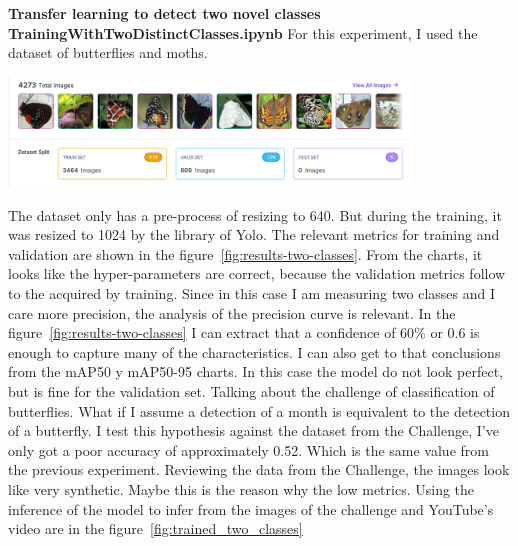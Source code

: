 \documentclass{cpsc202}
\begin{document}
    \newpage
    \textbf{Transfer learning to detect two novel classes}
    \Large\textbf{TrainingWithTwoDistinctClasses.ipynb}
    For this experiment, I used the dataset of butterflies and moths.
    \begin{center}
        \includegraphics[width=0.8\textwidth]{trained_two_classes/dataset_two_classes}
    \end{center}
    The dataset only has a pre-process of resizing to 640.
    But during the training, it was resized to 1024 by the library of Yolo.
    The relevant metrics for training and validation are shown in the figure~\ref{fig:results-two-classes}.
    From the charts, it looks like the hyper-parameters are correct, because the validation metrics follow to the acquired by training.
    Since in this case I am measuring two classes and I care more precision, the analysis of the precision curve is relevant.
    In the figure~\ref{fig:results-two-classes} I can extract that a confidence of 60\% or 0.6 is enough to capture many of the characteristics.
    I can also get to that conclusions from the mAP50 y mAP50-95 charts.
    In this case the model do not look perfect, but is fine for the validation set.
    Talking about the challenge of classification of butterflies.
    What if I assume a detection of a month is equivalent to the detection of a butterfly.
    I test this hypothesis against the dataset from the Challenge, I've only got a poor accuracy of approximately 0.52.
    Which is the same value from the previous experiment.
    Reviewing the data from the Challenge, the images look like very synthetic.
    Maybe this is the reason why the low metrics.
    Using the inference of the model to infer from the images of the challenge and YouTube's video are in the figure~\ref{fig:trained_two_classes}
\end{document}
